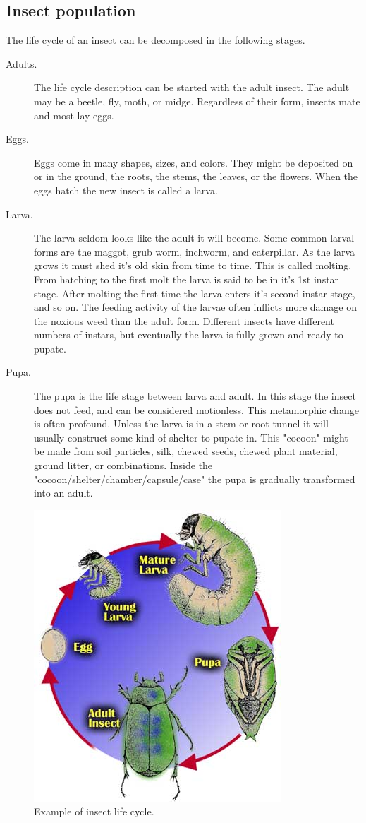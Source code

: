 \subsection{Insect population}
The life cycle of an insect can be decomposed in the following stages.
\begin{description}
\item[Adults.] 
The life cycle description can be started with the adult insect. The adult may be a beetle, fly, moth, or midge. Regardless of their form, insects mate and most lay eggs.
\item[Eggs.] 
Eggs come in many shapes, sizes, and colors. They might be deposited on or in the ground, the roots, the stems, the leaves, or the flowers. When the eggs hatch the new insect is called a larva. 
\item[Larva.]
The larva seldom looks like the adult it will become. Some common larval forms are the maggot, grub worm, inchworm, and caterpillar. As the larva grows it must shed it's old skin from time to time. This is called molting. From hatching to the first molt the larva is said to be in it's 1st instar stage. After molting the first time the larva enters it's second instar stage, and so on. The feeding activity of the larvae often inflicts more damage on the noxious weed than the adult form. Different insects have different numbers of instars, but eventually the larva is fully grown and ready to pupate.
\item[Pupa.] 
The pupa is the life stage between larva and adult. In this stage the insect does not feed, and can be considered motionless. This metamorphic change is often profound. Unless the larva is in a stem or root tunnel it will usually construct some kind of shelter to pupate in. This "cocoon" might be made from soil particles, silk, chewed seeds, chewed plant material, ground litter, or combinations.
Inside the "cocoon/shelter/chamber/capsule/case" the pupa is gradually transformed into an adult.
\end{description}
\begin{figure}
\begin{center}
\includegraphics[width=.4\textwidth]{figs_steph/insect_life_cycle}
\caption{Example of insect life cycle.}
\end{center}
\end{figure}



